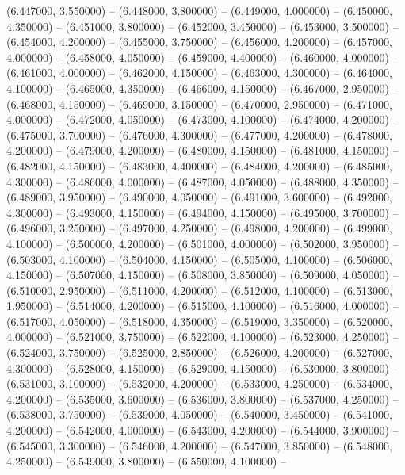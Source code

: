 (6.447000, 3.550000) -- 
(6.448000, 3.800000) -- 
(6.449000, 4.000000) -- 
(6.450000, 4.350000) -- 
(6.451000, 3.800000) -- 
(6.452000, 3.450000) -- 
(6.453000, 3.500000) -- 
(6.454000, 4.200000) -- 
(6.455000, 3.750000) -- 
(6.456000, 4.200000) -- 
(6.457000, 4.000000) -- 
(6.458000, 4.050000) -- 
(6.459000, 4.400000) -- 
(6.460000, 4.000000) -- 
(6.461000, 4.000000) -- 
(6.462000, 4.150000) -- 
(6.463000, 4.300000) -- 
(6.464000, 4.100000) -- 
(6.465000, 4.350000) -- 
(6.466000, 4.150000) -- 
(6.467000, 2.950000) -- 
(6.468000, 4.150000) -- 
(6.469000, 3.150000) -- 
(6.470000, 2.950000) -- 
(6.471000, 4.000000) -- 
(6.472000, 4.050000) -- 
(6.473000, 4.100000) -- 
(6.474000, 4.200000) -- 
(6.475000, 3.700000) -- 
(6.476000, 4.300000) -- 
(6.477000, 4.200000) -- 
(6.478000, 4.200000) -- 
(6.479000, 4.200000) -- 
(6.480000, 4.150000) -- 
(6.481000, 4.150000) -- 
(6.482000, 4.150000) -- 
(6.483000, 4.400000) -- 
(6.484000, 4.200000) -- 
(6.485000, 4.300000) -- 
(6.486000, 4.000000) -- 
(6.487000, 4.050000) -- 
(6.488000, 4.350000) -- 
(6.489000, 3.950000) -- 
(6.490000, 4.050000) -- 
(6.491000, 3.600000) -- 
(6.492000, 4.300000) -- 
(6.493000, 4.150000) -- 
(6.494000, 4.150000) -- 
(6.495000, 3.700000) -- 
(6.496000, 3.250000) -- 
(6.497000, 4.250000) -- 
(6.498000, 4.200000) -- 
(6.499000, 4.100000) -- 
(6.500000, 4.200000) -- 
(6.501000, 4.000000) -- 
(6.502000, 3.950000) -- 
(6.503000, 4.100000) -- 
(6.504000, 4.150000) -- 
(6.505000, 4.100000) -- 
(6.506000, 4.150000) -- 
(6.507000, 4.150000) -- 
(6.508000, 3.850000) -- 
(6.509000, 4.050000) -- 
(6.510000, 2.950000) -- 
(6.511000, 4.200000) -- 
(6.512000, 4.100000) -- 
(6.513000, 1.950000) -- 
(6.514000, 4.200000) -- 
(6.515000, 4.100000) -- 
(6.516000, 4.000000) -- 
(6.517000, 4.050000) -- 
(6.518000, 4.350000) -- 
(6.519000, 3.350000) -- 
(6.520000, 4.000000) -- 
(6.521000, 3.750000) -- 
(6.522000, 4.100000) -- 
(6.523000, 4.250000) -- 
(6.524000, 3.750000) -- 
(6.525000, 2.850000) -- 
(6.526000, 4.200000) -- 
(6.527000, 4.300000) -- 
(6.528000, 4.150000) -- 
(6.529000, 4.150000) -- 
(6.530000, 3.800000) -- 
(6.531000, 3.100000) -- 
(6.532000, 4.200000) -- 
(6.533000, 4.250000) -- 
(6.534000, 4.200000) -- 
(6.535000, 3.600000) -- 
(6.536000, 3.800000) -- 
(6.537000, 4.250000) -- 
(6.538000, 3.750000) -- 
(6.539000, 4.050000) -- 
(6.540000, 3.450000) -- 
(6.541000, 4.200000) -- 
(6.542000, 4.000000) -- 
(6.543000, 4.200000) -- 
(6.544000, 3.900000) -- 
(6.545000, 3.300000) -- 
(6.546000, 4.200000) -- 
(6.547000, 3.850000) -- 
(6.548000, 4.250000) -- 
(6.549000, 3.800000) -- 
(6.550000, 4.100000) -- 
